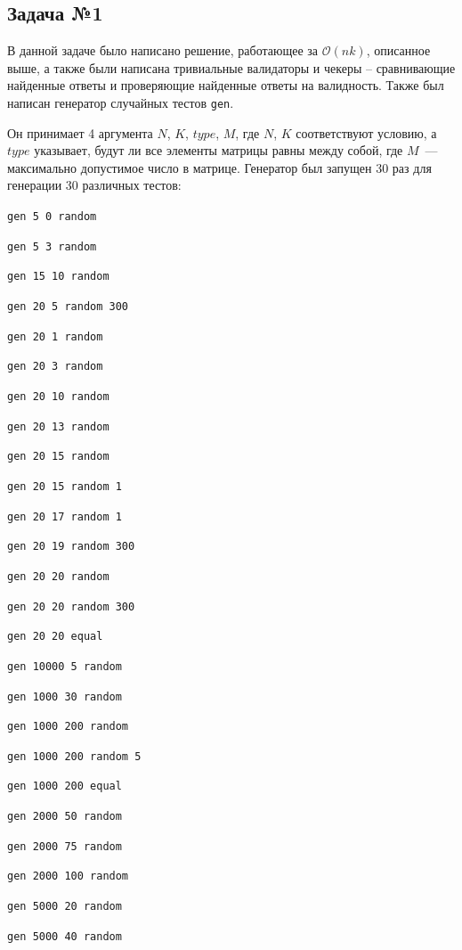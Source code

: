 \documentclass[a4paper]{article}
\begin{document}
\subsection{Задача №1}\label{realise.1}

В данной задаче было написано решение, работающее за $\mathcal O(nk)$, описанное выше, а также были написана тривиальные валидаторы и чекеры -- сравнивающие найденные ответы и проверяющие найденные ответы на валидность. Также был написан генератор случайных тестов \texttt{gen}.

Он принимает 4 аргумента $N$, $K$, $type$, $M$, где $N$, $K$ соответствуют условию, а $type$ указывает, будут ли все элементы матрицы равны между собой, где $M$~--- максимально допустимое число в матрице. Генератор был запущен 30 раз для генерации 30 различных тестов:

\texttt{gen 5 0 random }

\texttt{gen 5 3 random }

\texttt{gen 15 10 random }

\texttt{gen 20 5 random 300 }

\texttt{gen 20 1 random }

\texttt{gen 20 3 random }

\texttt{gen 20 10 random }

\texttt{gen 20 13 random }

\texttt{gen 20 15 random }

\texttt{gen 20 15 random 1 }

\texttt{gen 20 17 random 1 }

\texttt{gen 20 19 random 300 }

\texttt{gen 20 20 random }

\texttt{gen 20 20 random 300 }

\texttt{gen 20 20 equal }

\texttt{gen 10000 5 random }

\texttt{gen 1000 30 random }

\texttt{gen 1000 200 random }

\texttt{gen 1000 200 random 5 }

\texttt{gen 1000 200 equal }

\texttt{gen 2000 50 random }

\texttt{gen 2000 75 random }

\texttt{gen 2000 100 random }

\texttt{gen 5000 20 random }

\texttt{gen 5000 40 random }
\end{document}
